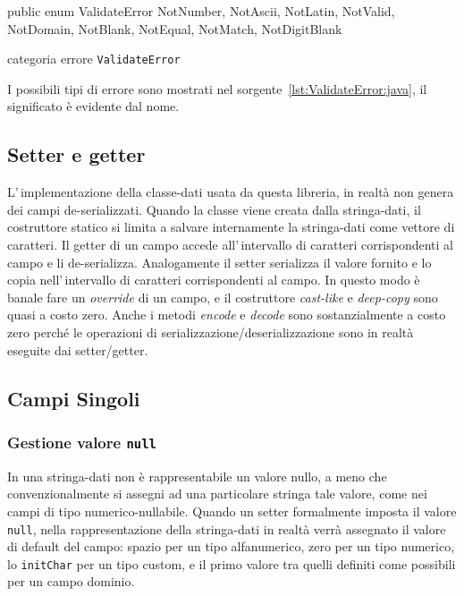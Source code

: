\documentclass[a4paper,10pt]{report}
\newif\ifesource
\newenvironment{elisting}[1][H]
  {\captionsetup{aboveskip=0pt}\begin{listing}[#1]}
  {\end{listing}%
}
\begin{document}
\ifesource
\begin{figure*}[!htb]
\begin{lstlisting}[language=java, 
caption={categoria errore \texttt{ValidateError}}, 
label=lst:ValidateError:java]
public enum ValidateError {
    NotNumber, NotAscii, NotLatin, NotValid, NotDomain, NotBlank, NotEqual, NotMatch, NotDigitBlank
}
\end{lstlisting}
\end{figure*}
\else
\begin{elisting}[!htb]
\begin{javacode}
public enum ValidateError {
    NotNumber, NotAscii, NotLatin, NotValid, NotDomain, NotBlank, NotEqual, NotMatch, NotDigitBlank
}
\end{javacode}
\caption{categoria errore \texttt{ValidateError}}
\label{lst:ValidateError:java}
\end{elisting}
\fi

I possibili tipi di errore sono mostrati nel 
sorgente~\ref{lst:ValidateError:java}, il significato è evidente dal nome.

\subsection{Setter e getter}
L'\,implementazione della classe-dati usata da questa libreria, in realtà non 
genera dei campi de-serializzati. 
Quando la classe viene creata dalla stringa-dati, il costruttore statico si 
limita a salvare internamente la stringa-dati come vettore di caratteri. 
Il getter di un campo accede all'\,intervallo di caratteri corrispondenti al 
campo e li de-serializza. 
Analogamente il setter serializza il valore fornito e lo copia 
nell'\,intervallo di caratteri corrispondenti al campo. 
In questo modo è banale fare un \textsl{override} di un campo, e il 
costruttore \textit{cast-like} e \textit{deep-copy} sono quasi a costo zero.
Anche i metodi \textsl{encode} e \textsl{decode} sono sostanzialmente a costo 
zero perché le operazioni di serializzazione/deserializzazione sono in realtà 
eseguite dai setter/getter.

\subsection{Campi Singoli}
\subsubsection*{Gestione valore \texttt{null}}
In una stringa-dati non è rappresentabile un valore nullo, a meno che 
convenzionalmente si assegni ad una particolare stringa tale valore, come nei 
campi di tipo numerico-nullabile.
Quando un setter formalmente imposta il valore \texttt{null}, nella 
rappresentazione della stringa-dati in realtà verrà assegnato il valore di
default del campo: spazio per un tipo alfanumerico, zero per un tipo numerico,
lo \texttt{initChar} per un tipo custom, e il primo valore tra quelli definiti 
come possibili per un campo dominio.
\end{document}
